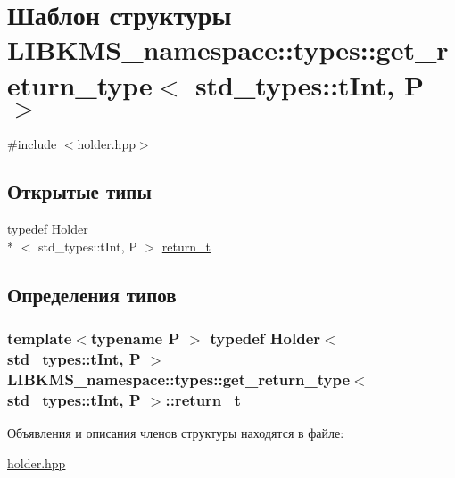 \hypertarget{structLIBKMS__namespace_1_1types_1_1get__return__type_3_01std__types_1_1tInt_00_01P_01_4}{\section{Шаблон структуры L\-I\-B\-K\-M\-S\-\_\-namespace\-:\-:types\-:\-:get\-\_\-return\-\_\-type$<$ std\-\_\-types\-:\-:t\-Int, P $>$}
\label{structLIBKMS__namespace_1_1types_1_1get__return__type_3_01std__types_1_1tInt_00_01P_01_4}
}


{\ttfamily \#include $<$holder.\-hpp$>$}

\subsection*{Открытые типы}
\begin{DoxyCompactItemize}
\item 
typedef \hyperlink{classLIBKMS__namespace_1_1Holder}{Holder}\\*
$<$ std\-\_\-types\-::t\-Int, P $>$ \hyperlink{structLIBKMS__namespace_1_1types_1_1get__return__type_3_01std__types_1_1tInt_00_01P_01_4_a6fde94d53bc1b9e92fe010f91968d049}{return\-\_\-t}
\end{DoxyCompactItemize}


\subsection{Определения типов}
\hypertarget{structLIBKMS__namespace_1_1types_1_1get__return__type_3_01std__types_1_1tInt_00_01P_01_4_a6fde94d53bc1b9e92fe010f91968d049}{
\subsubsection[{return\-\_\-t}]{\setlength{\rightskip}{0pt plus 5cm}template$<$typename P $>$ typedef {\bf Holder}$<$ std\-\_\-types\-::t\-Int, P $>$ {\bf L\-I\-B\-K\-M\-S\-\_\-namespace\-::types\-::get\-\_\-return\-\_\-type}$<$ std\-\_\-types\-::t\-Int, P $>$\-::{\bf return\-\_\-t}}}\label{structLIBKMS__namespace_1_1types_1_1get__return__type_3_01std__types_1_1tInt_00_01P_01_4_a6fde94d53bc1b9e92fe010f91968d049}


Объявления и описания членов структуры находятся в файле\-:\begin{DoxyCompactItemize}
\item 
\hyperlink{holder_8hpp}{holder.\-hpp}\end{DoxyCompactItemize}
